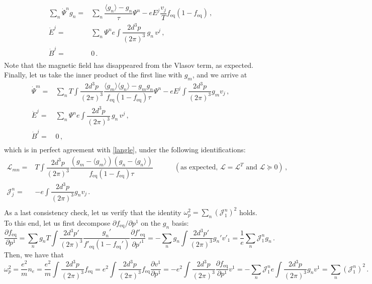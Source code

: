 \documentclass[a4paper, amsfonts, amssymb, amsmath, reprint, showkeys, nofootinbib, twoside,notitlepage,onecolumn]{revtex4-1}
\newcommand{\spc}{\quad \quad \quad}
\theoremstyle{definition}
\theoremstyle{theorem}
\begin{document}
\begin{equation}
\begin{split}
\sum_n \Dot{\Psi}^n g_n={}& \sum_n \dfrac{\langle g_n\rangle -g_n}{\tau} \Psi^n -eE^j\dfrac{ v_j}{T} f_{\text{eq}}(1-f_\text{eq}) \, , \\ 
\Dot{E}^j ={}& \sum_n \Psi^n e \int \dfrac{2d^3 p}{(2\pi)^3} \,  g_n \, v^j \, ,\\
\Dot{B}^j ={}& 0 \, .\\
\end{split}
\end{equation}
Note that the magnetic field has disappeared from the Vlasov term, as expected. Finally, let us take the inner product of the first line with $g_m$, and we arrive at
\begin{equation}
\begin{split}
\Dot{\Psi}^m ={}& \sum_n T \int \dfrac{2d^3 p}{(2\pi)^3} \dfrac{\langle g_m\rangle \langle g_n\rangle -g_m g_n }{f_{\text{eq}}(1-f_\text{eq})\tau}  \Psi^n -eE^j \int \dfrac{2d^3 p}{(2\pi)^3} g_m v_j  \, , \\ 
\Dot{E}^j ={}& \sum_n \Psi^n e \int \dfrac{2d^3 p}{(2\pi)^3} \,  g_n \, v^j \, ,\\
\Dot{B}^j ={}& 0 \, ,\\
\end{split}
\end{equation}
which is in perfect agreement with \eqref{langle}, under the following identifications:
\begin{equation}
\begin{split}
\mathcal{L}_{mn}={}& T \int \dfrac{2d^3 p}{(2\pi)^3} \dfrac{(g_m{-}\langle g_m\rangle) (g_n{-} \langle g_n\rangle)}{f_{\text{eq}}(1-f_\text{eq})\tau} \spc (\text{as expected, }\mathcal{L}=\mathcal{L}^T\text{ and }\mathcal{L}\succeq 0)\, , \\
\mathcal{J}^n_j ={}& -e  \int \dfrac{2d^3 p}{(2\pi)^3} g_n v_j  \, . \\
\end{split}
\end{equation}
As a last consistency check, let us verify that the identity $\omega_p^2=\sum_n(\mathcal{J}_1^n)^2$ holds. To this end, let us first decompose $\partial f_{\text{eq}}/\partial p^1$ on the $g_n$ basis:
\begin{equation}
\dfrac{\partial f_{\text{eq}}}{\partial p^1} = \sum_n g_n  T\int \dfrac{2d^3 p'}{(2\pi)^3} \dfrac{g_n'}{f'_{\text{eq}}(1-f_\text{eq}')} \dfrac{\partial f'_\text{eq}}{\partial p'^1} = - \sum_n g_n  \int \dfrac{2d^3 p'}{(2\pi)^3} g_n'  v'_1=\dfrac{1}{e}\sum_n \mathcal{J}_1^n g_n\, .
\end{equation}
Then, we have that
\begin{equation}
\omega_p^2 = \dfrac{e^2}{m} n_e =\dfrac{e^2}{m}\int \dfrac{2d^3 p}{(2\pi)^3} f_{\text{eq}}=e^2\int \dfrac{2d^3 p}{(2\pi)^3} f_{\text{eq}}\dfrac{\partial v^1}{\partial p^1}=-e^2\int \dfrac{2d^3 p}{(2\pi)^3} \dfrac{\partial f_{\text{eq}}}{\partial p^1} v^1=-\sum_n \mathcal{J}_1^n e\int \dfrac{2d^3 p}{(2\pi)^3} g_n v^1=\sum_n (\mathcal{J}_1^n)^2 \, .
\end{equation}
\end{document}
